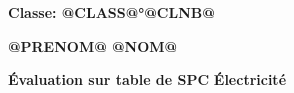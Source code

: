 \documentclass[11pt,french,a4paper]{article} %
\begin{document}
\vspace*{\fill}


\begin{center}
{\huge \textbf{Classe: @CLASS@°@CLNB@}}

\hfill

\hfill

{\Huge \textbf{@PRENOM@ @NOM@}}

\hfill

\hfill

{\huge \textbf{Évaluation sur table de SPC}}
{\Huge \textbf{Électricité}}


\end{center}

\vspace*{\fill}



\pagebreak
\end{document}
